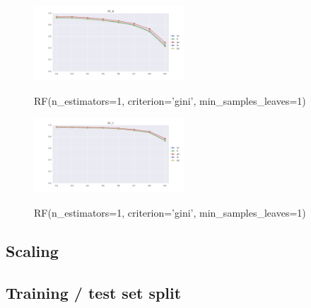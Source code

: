 \documentclass{sig-alternate-05-2015}
\begin{document}
\begin{figure}[]
  \centering
  \caption{RF(n\_estimators=1, criterion='gini', min\_samples\_leaves=1)}
  \includegraphics[width=0.5\textwidth]{../plots/RF_B}
  \label{fig:anomalySetup}
\end{figure}

\begin{figure}[]
  \centering
  \caption{RF(n\_estimators=1, criterion='gini', min\_samples\_leaves=1)}
  \includegraphics[width=0.5\textwidth]{../plots/RF_C}
  \label{fig:anomalySetup}
\end{figure}





\subsection{Scaling}

\subsection{Training / test set split}
\end{document}
